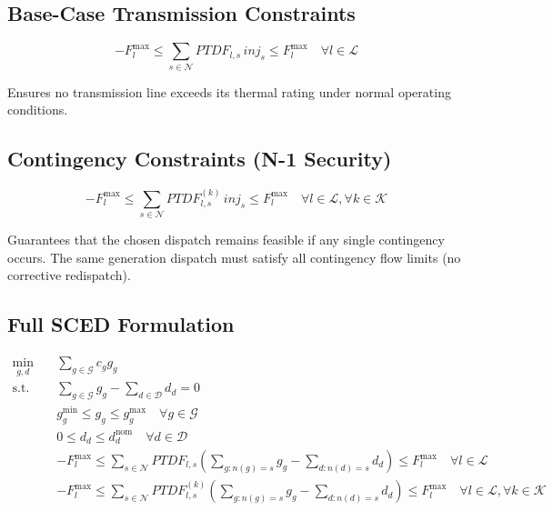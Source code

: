 \documentclass[11pt]{article}
\begin{document}
\subsection{Base-Case Transmission Constraints}

\begin{equation}
- F_l^{\max}
\le
\sum_{s \in \mathcal{N}} PTDF_{l,s} \, inj_s
\le
F_l^{\max}
\quad \forall l \in \mathcal{L}
\end{equation}

 
Ensures no transmission line exceeds its thermal rating under normal operating conditions.

\subsection{ Contingency Constraints (N-1 Security)}

\begin{equation}
- F_l^{\max}
\le
\sum_{s \in \mathcal{N}} PTDF_{l,s}^{(k)} \, inj_s
\le
F_l^{\max}
\quad \forall l \in \mathcal{L}, \forall k \in \mathcal{K}
\end{equation}

 
Guarantees that the chosen dispatch remains feasible if any single contingency occurs.  
The same generation dispatch must satisfy all contingency flow limits (no corrective redispatch).

\subsection{ Full SCED Formulation}

\begin{align}
\min_{g,d} \quad
& \sum_{g \in \mathcal{G}} c_g g_g
\\[6pt]
\text{s.t.} \quad
& \sum_{g \in \mathcal{G}} g_g
-
\sum_{d \in \mathcal{D}} d_d
= 0
\\[6pt]
& g_g^{\min} \le g_g \le g_g^{\max}
\quad \forall g \in \mathcal{G}
\\[6pt]
& 0 \le d_d \le d_d^{\text{nom}}
\quad \forall d \in \mathcal{D}
\\[6pt]
& -F_l^{\max}
\le
\sum_{s \in \mathcal{N}} PTDF_{l,s}
\left(
\sum_{g: n(g)=s} g_g
-
\sum_{d: n(d)=s} d_d
\right)
\le
F_l^{\max}
\quad \forall l \in \mathcal{L}
\\[6pt]
& -F_l^{\max}
\le
\sum_{s \in \mathcal{N}} PTDF_{l,s}^{(k)}
\left(
\sum_{g: n(g)=s} g_g
-
\sum_{d: n(d)=s} d_d
\right)
\le
F_l^{\max}
\quad \forall l \in \mathcal{L}, \forall k \in \mathcal{K}
\end{align}
\end{document}
